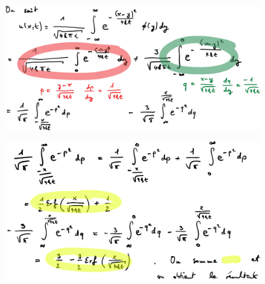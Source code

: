 \begin{figure}[H]
    \centering
    \includegraphics[width=\linewidth]{images/semaine3_diff1.png}
\end{figure}
\begin{figure}[H]
    \centering
    \includegraphics[width=\linewidth]{images/semaine3_diff2.png}
\end{figure}


